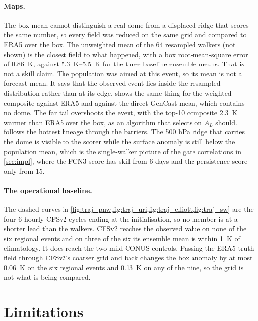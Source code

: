 \documentclass[10pt,twocolumn]{article}
\newcommand{\AL}{A_L}
\begin{document}
\paragraph{Maps.}
The box mean cannot distinguish a real dome from a displaced ridge that scores the same number, so every field was reduced on the same grid and compared to ERA5 over the box. The unweighted mean of the 64 resampled walkers (not shown) is the closest field to what happened, with a box root-mean-square error of \SI{0.86}{K}, against \SIrange{5.3}{5.5}{K} for the three baseline ensemble means. That is not a skill claim. The population was aimed at this event, so its mean is not a forecast mean. It says that the observed event lies inside the resampled distribution rather than at its edge.  shows the same thing for the weighted composite against ERA5 and against the direct GenCast mean, which contains no dome. The far tail overshoots the event, with the top-10 composite \SI{2.3}{K} warmer than ERA5 over the box, as an algorithm that selects on $\AL$ should.  follows the hottest lineage through the barriers. The 500 hPa ridge that carries the dome is visible to the scorer while the surface anomaly is still below the population mean, which is the single-walker picture of the gate correlations in \cref{sec:impl}, where the FCN3 score has skill from 6 days and the persistence score only from 15.

\paragraph{The operational baseline.}
The dashed curves in \cref{fig:traj_pnw,fig:traj_uri,fig:traj_elliott,fig:traj_sw} are the four 6-hourly CFSv2 cycles ending at the initialisation, so no member is at a shorter lead than the walkers. CFSv2 reaches the observed value on none of the six regional events and on three of the six its ensemble mean is within \SI{1}{K} of climatology. It does reach the two mild CONUS controls. Passing the ERA5 truth field through CFSv2's coarser grid and back changes the box anomaly by at most \SI{0.06}{K} on the six regional events and \SI{0.13}{K} on any of the nine, so the grid is not what is being compared.

\section{Limitations}
\label{sec:limits}
\end{document}
